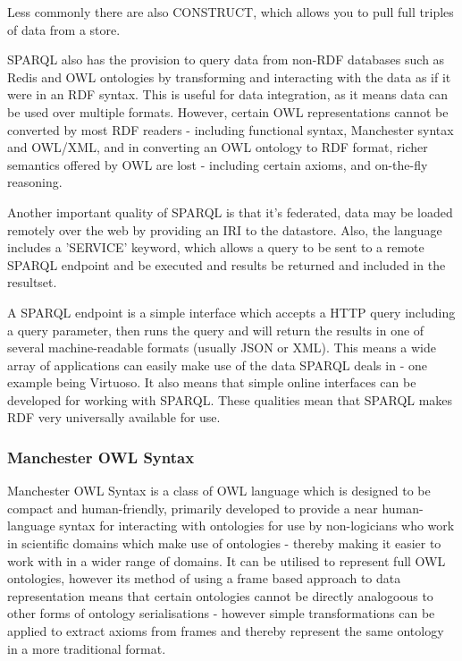\documentclass{article}
\begin{document}
Less commonly there are also CONSTRUCT, which allows you to pull full triples of
data from a store.

SPARQL also has the provision to query data from non-RDF databases such as Redis
and OWL ontologies by transforming and interacting with the data as if it were
in an RDF syntax. This is useful for data integration, as it means data can be
used over multiple formats. However, certain OWL representations cannot be
converted by most RDF readers - including functional syntax, Manchester syntax
and OWL/XML, and in converting an OWL ontology to RDF format, richer semantics
offered by OWL are lost - including certain axioms, and on-the-fly reasoning.

Another important quality of SPARQL is that it's federated, data may be loaded
remotely over the web by providing an IRI to the datastore. Also, the language
includes a 'SERVICE' keyword, which allows a query to be sent to a remote SPARQL
endpoint and be executed and results be returned and included in the
resultset.\cite{sservice}

A SPARQL endpoint is a simple interface which accepts a HTTP query including a
query parameter, then runs the query and will return the results in one of 
several machine-readable formats (usually JSON or XML). This means a wide array
of applications can easily make use of the data SPARQL deals in - one example
being Virtuoso. It also means that simple online interfaces can be developed for 
working with SPARQL. These qualities mean that SPARQL makes RDF very universally
available for use.

\subsubsection{Manchester OWL Syntax}

Manchester OWL Syntax is a class of OWL language which is designed to be compact
and human-friendly, primarily developed to provide a near human-language syntax
for interacting with ontologies for use by non-logicians who work in scientific
domains which make use of ontologies - thereby making it easier to work with in
a wider range of domains.\cite{manchesterowl} It can be utilised to represent full OWL
ontologies, however its method of using a frame based approach to data
representation means that certain ontologies cannot be directly analogoous to
other forms of ontology serialisations - however simple transformations can be
applied to extract axioms from frames and thereby represent the same ontology in
a more traditional format. 
\end{document}
